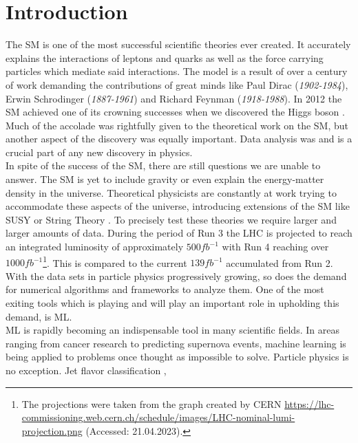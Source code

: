 \chapter*{Introduction}
The \ac{SM} is one of the most successful scientific theories ever
created. It accurately explains the interactions of leptons and quarks as well as the force
carrying particles which mediate said interactions. The model is a result of over a century of work
demanding the contributions of great minds like Paul Dirac (\emph{1902-1984}), Erwin Schrodinger (\emph{1887-1961}) and Richard Feynman (\emph{1918-1988}).
In 2012 the \ac{SM} achieved one of its crowning successes when we discovered the Higgs boson \cite{Aad_2012}. 
Much of the accolade was rightfully given to the theoretical work on the \ac{SM}, but another aspect of the discovery 
was equally important. Data analysis was and is a crucial part of any new discovery in physics. \newline
\\
In spite of the success of the \ac{SM}, there are still questions we are unable to answer.
The \ac{SM} is yet to include gravity or even explain the energy-matter density in the universe. Theoretical physicists 
are constantly at work trying to accommodate these aspects of the universe,
introducing extensions of the \ac{SM} like \ac{SUSY} \cite{SUSY} or String Theory \cite{cole_probing_2021}. To precisely test these theories
we require larger and larger amounts of data. During the period of Run 3 the \ac{LHC} is projected to reach an integrated luminosity of approximately  
$500fb^{-1}$ with Run 4 reaching over $1000fb^{-1}$\footnote{The projections were taken from the graph created by CERN
\url{https://lhc-commissioning.web.cern.ch/schedule/images/LHC-nominal-lumi-projection.png}
(Accessed: 21.04.2023).}. This is compared to the current $139fb^{-1}$ accumulated from Run 2. With the data sets in particle physics progressively growing, 
so does the demand for numerical algorithms and frameworks to analyze them. One of the most exiting tools which is playing and will play an important role in upholding 
this demand, is \ac{ML}.\newline
\\
\ac{ML} is rapidly becoming an indispensable tool in many scientific fields.
In areas ranging from cancer research to predicting supernova events, machine learning is being applied to problems
once thought as impossible to solve. Particle physics is no exception. Jet flavor classification \cite{Guest_2016}, 

